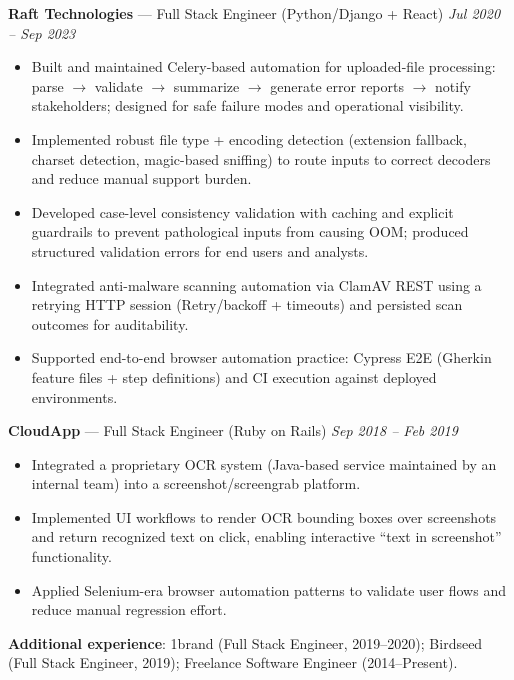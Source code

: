 \documentclass[10pt]{article}
\begin{document}
\textbf{Raft Technologies} --- Full Stack Engineer (Python/Django + React) \hfill \textit{Jul 2020 -- Sep 2023}\\
\vspace{-6pt}
\begin{itemize}
  \setlength\itemsep{-2pt}
  \setlength\parskip{0pt}
  \setlength\parsep{0pt}
  \item Built and maintained Celery-based automation for uploaded-file processing: parse $\rightarrow$ validate $\rightarrow$ summarize $\rightarrow$ generate error reports $\rightarrow$ notify stakeholders; designed for safe failure modes and operational visibility.
  \item Implemented robust file type + encoding detection (extension fallback, charset detection, magic-based sniffing) to route inputs to correct decoders and reduce manual support burden.
  \item Developed case-level consistency validation with caching and explicit guardrails to prevent pathological inputs from causing OOM; produced structured validation errors for end users and analysts.
  \item Integrated anti-malware scanning automation via ClamAV REST using a retrying HTTP session (Retry/backoff + timeouts) and persisted scan outcomes for auditability.
  \item Supported end-to-end browser automation practice: Cypress E2E (Gherkin feature files + step definitions) and CI execution against deployed environments.
\end{itemize}

\textbf{CloudApp} --- Full Stack Engineer (Ruby on Rails) \hfill \textit{Sep 2018 -- Feb 2019}\\
\vspace{-6pt}
\begin{itemize}
  \setlength\itemsep{-2pt}
  \setlength\parskip{0pt}
  \setlength\parsep{0pt}
  \item Integrated a proprietary OCR system (Java-based service maintained by an internal team) into a screenshot/screengrab platform.
  \item Implemented UI workflows to render OCR bounding boxes over screenshots and return recognized text on click, enabling interactive ``text in screenshot'' functionality.
  \item Applied Selenium-era browser automation patterns to validate user flows and reduce manual regression effort.
\end{itemize}

\textbf{Additional experience}: 1brand (Full Stack Engineer, 2019--2020); Birdseed (Full Stack Engineer, 2019); Freelance Software Engineer (2014--Present).
\end{document}

